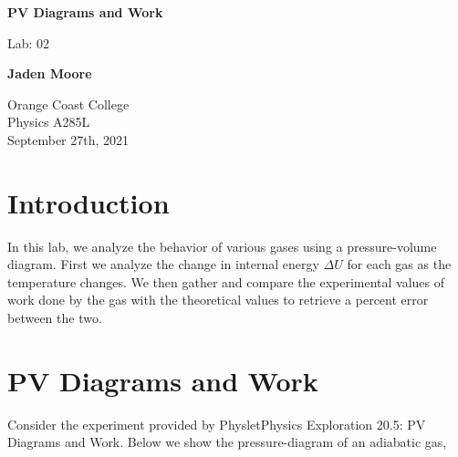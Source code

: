 \documentclass[12pt]{article}
\begin{document}

\begin{titlepage}
    \begin{center}
        \vspace*{1cm}
        \textbf{PV Diagrams and Work}

        \vspace{0.5cm}
        Lab: 02

        \vspace{1cm}

        \textbf{Jaden Moore}

        \vfill

        Orange Coast College\\
        Physics A285L\\
        September 27th, 2021

    \end{center}
\end{titlepage}

\pagestyle{fancy}
\fancyhf{}
\setlength{\headheight}{15pt}
\cfoot{\thepage}

\section{Introduction}
In this lab, we analyze the behavior of various gases using a pressure-volume diagram. First we analyze the change in internal energy $\Delta U$ for each gas as the temperature changes. We then gather and compare the experimental values of work done by the gas with the theoretical values to retrieve a percent error between the two.

\section{PV Diagrams and Work}
Consider the experiment provided by Physlet\textregistered \space Physics Exploration 20.5: PV Diagrams and Work. Below we show the pressure-diagram of an adiabatic gas,
\end{document}
